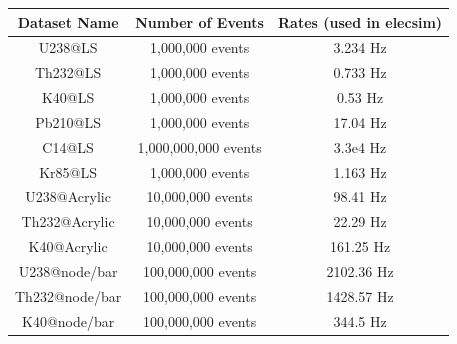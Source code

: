 



 

\begin{table}[htp]
\centering
\begin{tabular}{|c|c|c|}
	\hline
 \textbf{Dataset Name}  & \textbf{Number of Events}  & \textbf{Rates (used in elecsim)}   \\\hline\hline
      U238@LS      &   1,000,000 events    &           3.234 Hz            \\\hline
     Th232@LS      &   1,000,000 events    &           0.733 Hz            \\\hline
      K40@LS       &   1,000,000 events    &           0.53 Hz             \\\hline
     Pb210@LS      &   1,000,000 events    &           17.04 Hz            \\\hline
      C14@LS       & 1,000,000,000 events  &           3.3e4 Hz            \\\hline
      Kr85@LS      &   1,000,000 events    &           1.163 Hz            \\\hline
   U238@Acrylic    &   10,000,000 events   &           98.41 Hz            \\\hline
   Th232@Acrylic   &   10,000,000 events   &           22.29 Hz            \\\hline
    K40@Acrylic    &   10,000,000 events   &          161.25 Hz            \\\hline
   U238@node/bar   &  100,000,000 events   &          2102.36 Hz           \\\hline
  Th232@node/bar   &  100,000,000 events   &          1428.57 Hz           \\\hline
   K40@node/bar    &  100,000,000 events   &           344.5 Hz            \\\hline

\end{tabular}
\end{table}
